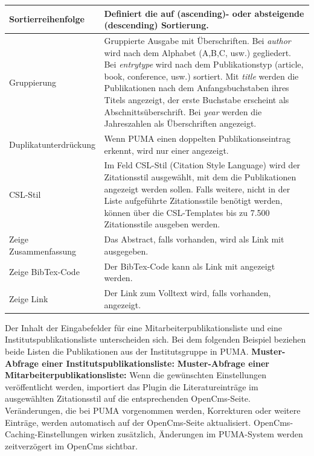 \begin{longtabu}{|X|p{7cm}|}
Sortierreihenfolge &	Definiert die auf (ascending)- oder absteigende (descending) Sortierung.\\ \hline 
Gruppierung &	Gruppierte Ausgabe mit Überschriften. Bei \textit{author} wird nach dem Alphabet (A,B,C, usw.) gegliedert. Bei \textit{entrytype} wird nach dem Publikationstyp (article, book, conference, usw.) sortiert. Mit \textit{title} werden die Publikationen nach dem Anfangsbuchstaben ihres Titels angezeigt, der erste Buchstabe erscheint als Abschnittsüberschrift. Bei \textit{year} werden die Jahreszahlen als Überschriften angezeigt.\\ \hline
Duplikatunterdrückung &	Wenn PUMA einen doppelten Publikationseintrag erkennt, wird nur einer angezeigt.\\ \hline
CSL-Stil &	Im Feld CSL-Stil (Citation Style Language) wird der Zitationsstil ausgewählt, mit dem die Publikationen angezeigt werden sollen. Falls weitere, nicht in der Liste aufgeführte Zitationsstile benötigt werden, können über die CSL-Templates bis zu 7.500 Zitationsstile ausgeben werden.\\ \hline
Zeige Zusammenfassung& 	Das Abstract, falls vorhanden, wird als Link mit ausgegeben.\\ \hline
Zeige BibTex-Code &	Der BibTex-Code kann als Link mit angezeigt werden.\\ \hline
Zeige Link & Der Link zum Volltext wird, falls vorhanden, angezeigt.\\ \hline
\end{longtabu}
Der Inhalt der Eingabefelder für eine Mitarbeiterpublikationsliste und eine Institutspublikationsliste unterscheiden sich. Bei dem folgenden Beispiel beziehen beide Listen die Publikationen aus der Institutsgruppe in PUMA.\newline\newline
\textbf{Muster-Abfrage einer Institutspublikationsliste:}\newline %
\textbf {Muster-Abfrage einer Mitarbeiterpublikationsliste:}\newline%
\newline
Wenn die gewünschten Einstellungen veröffentlicht werden, importiert das Plugin die Literatureinträge im ausgewählten Zitationsstil auf die entsprechenden OpenCms-Seite. Veränderungen, die bei PUMA vorgenommen werden, Korrekturen oder weitere Einträge, werden automatisch auf der OpenCms-Seite aktualisiert. OpenCms-Caching-Einstellungen wirken zusätzlich, Änderungen im PUMA-System werden zeitverzögert im OpenCms sichtbar.
